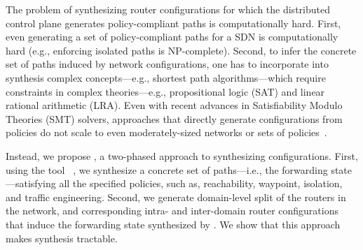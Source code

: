 

The problem of synthesizing router configurations
for which the distributed control plane  
generates policy-compliant paths 
is computationally hard. 
First, even generating a set of policy-compliant 
paths for a SDN  is 
computationally hard (e.g., enforcing isolated
paths is NP-complete). 
Second, to infer the concrete
set of paths induced by network configurations, 
one has to incorporate
into synthesis
complex concepts---e.g., shortest path algorithms---which
require constraints in complex
theories---e.g., propositional logic (SAT) 
and linear rational
arithmetic (LRA). Even with recent 
advances in Satisfiability Modulo Theories
(SMT) solvers, 
approaches that directly generate configurations  from policies
do not scale to
even moderately-sized networks or 
sets of policies~\cite{synet}.


Instead, we propose \name, a two-phased approach to synthesizing
configurations.  First, using the tool \genesis~\cite{genesis}, we synthesize a
concrete set of paths---i.e., the forwarding state---satisfying all
the specified policies, such as, reachability, waypoint, isolation,
and traffic engineering.
Second, we generate
domain-level split of the routers in the network,
and corresponding 
intra- and inter-domain router configurations
that induce the forwarding
state synthesized by \genesis. We show that this approach makes synthesis tractable.

